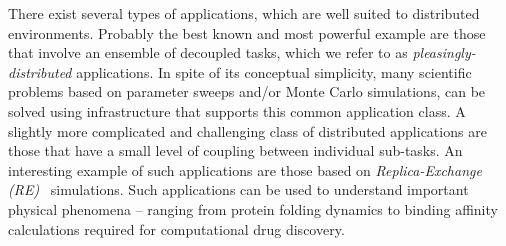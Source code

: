 \documentclass[conference,final]{IEEEtran}
\newcommand{\up}{\vspace*{-1em}}
\newcommand{\kimnote}[1]{ {\textcolor{green} { ***JK: #1 }}}
\newcommand{\jhanote}[1]{ {\textcolor{red} { ***SJ: #1 }}}
\newcommand{\kimnote}[1]{}
\newcommand{\jhanote}[1]{}
\begin{document}
\begin{abstract}
\end{abstract}

\up \up
{}
                           
\up There exist several types of applications, which are well suited
to distributed environments. Probably the best known and most powerful
example are those that involve an ensemble of decoupled tasks, which
we refer to as {\it pleasingly-distributed} applications. In spite of
its conceptual simplicity, many scientific problems based on parameter
sweeps and/or Monte Carlo simulations, can be solved using
infrastructure that supports this common application class. A slightly
more complicated and challenging class of distributed applications are
those that have a small level of coupling between individual
sub-tasks.  An interesting example of such applications are those
based on \emph{Replica-Exchange (RE)}~\cite{hansmann,Sugita:1999rm}
simulations.  Such applications can be used to understand important
physical phenomena -- ranging from protein folding dynamics to binding
affinity calculations required for computational drug discovery.


  

              
\end{document}
